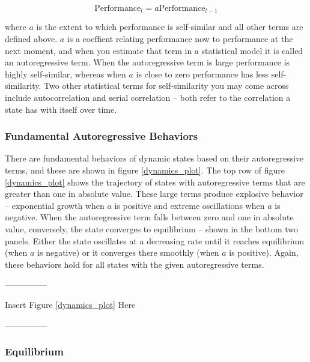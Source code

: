 \documentclass[english,,man]{apa6}
\theoremstyle{definition}
\theoremstyle{definition}
\theoremstyle{definition}
\theoremstyle{remark}
\begin{document}
\begin{equation}
\textrm{Performance}_{t} = a \textrm{Performance}_{t-1}
\end{equation}

\noindent where \(a\) is the extent to which performance is self-similar
and all other terms are defined above. \(a\) is a coeffient relating
performance now to performance at the next moment, and when you estimate
that term in a statistical model it is called an autoregressive term.
When the autoregressive term is large performance is highly
self-similar, whereas when \(a\) is close to zero performance has less
self-similarity. Two other statistical terms for self-similarity you may
come across include autocorrelation and serial correlation -- both refer
to the correlation a state has with itself over time.

\hypertarget{fundamental-autoregressive-behaviors}{%
\subsubsection{Fundamental Autoregressive
Behaviors}\label{fundamental-autoregressive-behaviors}}

There are fundamental behaviors of dynamic states based on their
autoregressive terms, and these are shown in figure \ref{dynamics_plot}.
The top row of figure \ref{dynamics_plot} shows the trajectory of states
with autoregressive terms that are greater than one in absolute value.
These large terms produce explosive behavior -- exponential growth when
\(a\) is positive and extreme oscillations when \(a\) is negative. When
the autoregressive term falls between zero and one in absolute value,
conversely, the state converges to equilibrium -- shown in the bottom
two panels. Either the state oscillates at a decreasing rate until it
reaches equilibrium (when \(a\) is negative) or it converges there
smoothly (when \(a\) is positive). Again, these behaviors hold for all
states with the given autoregressive terms.

\begin{center}

---------------

Insert Figure \ref{dynamics_plot} Here

---------------

\end{center}

\hypertarget{equilibrium}{%
\subsubsection{Equilibrium}\label{equilibrium}}
\end{document}
